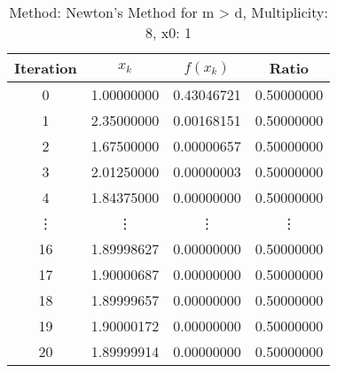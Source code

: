\begin{table}
\centering
\caption{Method: Newton's Method for m > d, Multiplicity: 8, x0: 1}
\label{tab:table_Newton's_Method_for_m_>_d_8_1}
\begin{tabular}{c c c c}
\toprule
Iteration &      $x_k$ &   $f(x_k)$ &      Ratio \\
\midrule
        0 & 1.00000000 & 0.43046721 & 0.50000000 \\
        1 & 2.35000000 & 0.00168151 & 0.50000000 \\
        2 & 1.67500000 & 0.00000657 & 0.50000000 \\
        3 & 2.01250000 & 0.00000003 & 0.50000000 \\
        4 & 1.84375000 & 0.00000000 & 0.50000000 \\
   \vdots &     \vdots &     \vdots &     \vdots \\
       16 & 1.89998627 & 0.00000000 & 0.50000000 \\
       17 & 1.90000687 & 0.00000000 & 0.50000000 \\
       18 & 1.89999657 & 0.00000000 & 0.50000000 \\
       19 & 1.90000172 & 0.00000000 & 0.50000000 \\
       20 & 1.89999914 & 0.00000000 & 0.50000000 \\
\bottomrule
\end{tabular}
\end{table}
